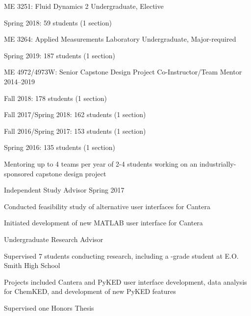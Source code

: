 \begin{outerlist}
\item ME 3251: Fluid Dynamics 2 \hfill Undergraduate, Elective
\begin{innerlist}
    \item Spring 2018: 59 students (1 section)
\end{innerlist}

\item ME 3264: Applied Measurements Laboratory \hfill Undergraduate, Major-required
\begin{innerlist}
    \item Spring 2019: 187 students (1 section)
\end{innerlist}

\item ME 4972/4973W: Senior Capstone Design Project Co-Instructor/Team Mentor \hfill 2014--2019
\begin{innerlist}
    \item Fall 2018: 178 students (1 section)
    \item Fall 2017/Spring 2018: 162 students (1 section)
    \item Fall 2016/Spring 2017: 153 students (1 section)
    \item Spring 2016: 135 students (1 section)
    \item Mentoring up to 4 teams per year of 2-4 students working on an
    industrially-sponsored capstone design project
\end{innerlist}

\item Independent Study Advisor \hfill Spring 2017
\begin{innerlist}
    \item Conducted feasibility study of alternative user interfaces for Cantera
    \item Initiated development of new \textsc{MATLAB} user interface for Cantera
\end{innerlist}

\item Undergraduate Research Advisor
\begin{innerlist}
    \item Supervised 7 students conducting research, including a -grade student at E.O. Smith High School
    \item Projects included Cantera and PyKED user interface development, data analysis for ChemKED, and development of new PyKED features
    \item Supervised one Honors Thesis
\end{innerlist}

\end{outerlist}

